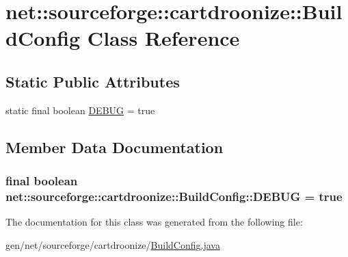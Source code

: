 \hypertarget{classnet_1_1sourceforge_1_1cartdroonize_1_1BuildConfig}{
\section{net::sourceforge::cartdroonize::BuildConfig Class Reference}
\label{classnet_1_1sourceforge_1_1cartdroonize_1_1BuildConfig}
}
\subsection*{Static Public Attributes}
\begin{DoxyCompactItemize}
\item 
static final boolean \hyperlink{classnet_1_1sourceforge_1_1cartdroonize_1_1BuildConfig_ab8efcacc90587773d2d01b00112c1d4b}{DEBUG} = true
\end{DoxyCompactItemize}


\subsection{Member Data Documentation}
\hypertarget{classnet_1_1sourceforge_1_1cartdroonize_1_1BuildConfig_ab8efcacc90587773d2d01b00112c1d4b}{
\subsubsection[{DEBUG}]{\setlength{\rightskip}{0pt plus 5cm}final boolean {\bf net::sourceforge::cartdroonize::BuildConfig::DEBUG} = true}}
\label{classnet_1_1sourceforge_1_1cartdroonize_1_1BuildConfig_ab8efcacc90587773d2d01b00112c1d4b}


The documentation for this class was generated from the following file:\begin{DoxyCompactItemize}
\item 
gen/net/sourceforge/cartdroonize/\hyperlink{BuildConfig_8java}{BuildConfig.java}\end{DoxyCompactItemize}
